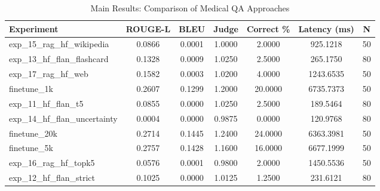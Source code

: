 \begin{table}[htbp]
\centering
\caption{Main Results: Comparison of Medical QA Approaches}
\label{tab:main_results}
\begin{tabular}{lcccccc}
\toprule
Experiment & ROUGE-L & BLEU & Judge & Correct \% & Latency (ms) & N \\
\midrule
exp\_15\_rag\_hf\_wikipedia & 0.0866 & 0.0001 & 1.0000 & 2.0000 & 925.1218 & 50 \\
exp\_13\_hf\_flan\_flashcard & 0.1328 & 0.0009 & 1.0250 & 2.5000 & 265.1750 & 80 \\
exp\_17\_rag\_hf\_web & 0.1582 & 0.0003 & 1.0200 & 4.0000 & 1243.6535 & 50 \\
finetune\_1k & 0.2607 & 0.1299 & 1.2000 & 20.0000 & 6735.7373 & 50 \\
exp\_11\_hf\_flan\_t5 & 0.0855 & 0.0000 & 1.0250 & 2.5000 & 189.5464 & 80 \\
exp\_14\_hf\_flan\_uncertainty & 0.0004 & 0.0000 & 0.9875 & 0.0000 & 120.9768 & 80 \\
finetune\_20k & 0.2714 & 0.1445 & 1.2400 & 24.0000 & 6363.3981 & 50 \\
finetune\_5k & 0.2757 & 0.1428 & 1.1600 & 16.0000 & 6677.1999 & 50 \\
exp\_16\_rag\_hf\_topk5 & 0.0576 & 0.0001 & 0.9800 & 2.0000 & 1450.5536 & 50 \\
exp\_12\_hf\_flan\_strict & 0.1025 & 0.0000 & 1.0125 & 1.2500 & 231.6121 & 80 \\
\bottomrule
\end{tabular}
\end{table}